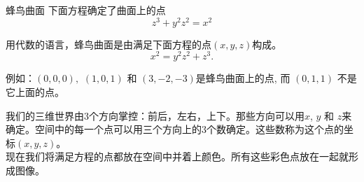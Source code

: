 ﻿\begin{surferPage}{蜂鸟曲面}
下面方程确定了曲面上的点\\
  
  \smallskip
\[z^3+ y^2	z^2	= x^2\]

\singlespacing
用代数的语言，蜂鸟曲面是由满足下面方程的点$(x, y, z)$构成。
\smallskip
\[ x^2= y^2z^2+z^3.\]

\smallskip
例如：$(0,0,0),$ $(1,0,1)$ 和 $(3,-2,-3)$是蜂鸟曲面上的点, 而 $(0,1,1)$ 不是它上面的点。\\

\singlespacing

我们的三维世界由3个方向掌控：前后，左右，上下。那些方向可以用$x$, $y$ 和 $z$来确定。空间中的每一个点可以用三个方向上的3个数确定。这些数称为这个点的坐标$(x,y,z)$。\\

\singlespacing
现在我们将满足方程的点都放在空间中并着上颜色。所有这些彩色点放在一起就形成图像。
\end{surferPage}

